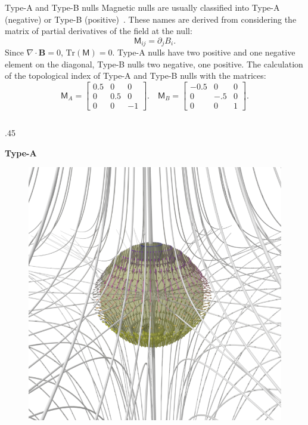 \documentclass[final]{beamer}
\newlength{\onecolwid}
\newlength{\twocolwid}
\begin{document}
\begin{frame}[t]
\begin{columns}[t]
\begin{column}{\twocolwid}
\begin{columns}[t,totalwidth=\twocolwid]
\begin{column}{\onecolwid}
\begin{block}{Type-A and Type-B nulls}
    Magnetic nulls are usually classified into Type-A (negative) or Type-B (positive)~\cite{lau1990three, parnell1996structure, greene1988geometrical}.
    These names are derived from considering the matrix of partial derivatives of the
    field at the null:
    \begin{equation}\label{eq:matrix}
        \mathsf{M}_{ij}= \partial_j B_i.
    \end{equation}
    Since $\nabla\cdot\mathbf{B}=0$, $\mathrm{Tr}(\mathsf{M})=0$.
    Type-A nulls have two positive and one negative element on the diagonal, Type-B nulls
    two negative, one positive.
    The calculation of the topological index of Type-A and Type-B nulls with the matrices:
    \begin{equation}
        \mathsf{M}_A = \begin{bmatrix} 0.5 & 0&0 \\ 0 & 0.5 & 0 \\
        0&0& -1  \end{bmatrix}.
        \quad
        \mathsf{M}_B = \begin{bmatrix} -0.5 & 0&0 \\ 0 & -.5 & 0 \\
        0&0& 1  \end{bmatrix}.
    \end{equation}
\begin{columns}[t,totalwidth=\onecolwid] %
    \begin{column}{.45\onecolwid}
        \begin{centering}
        \textbf{Type-A}
        \begin{figure}
        \includegraphics[width=.45\onecolwid]{fig/negindex_start.png}

\end{figure}
\end{centering}
\end{column}
\end{columns}
\end{block}
\end{column}
\end{columns}
\end{column}
\end{columns}
\end{frame}
\end{document}

